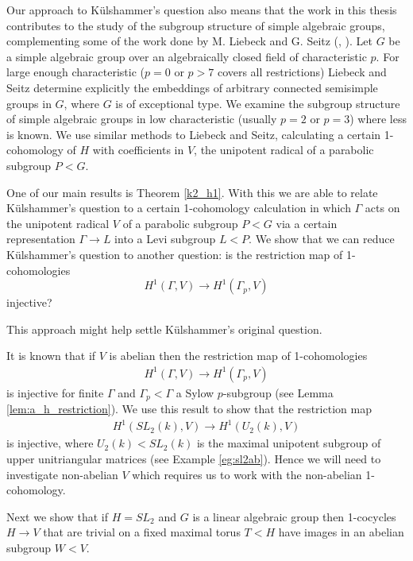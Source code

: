 Our approach to K\"ulshammer's question also means that the work in this thesis contributes to the study of the subgroup structure of simple algebraic groups, complementing some of the work done by M. Liebeck and G. Seitz (\cite{liebeck1996reductive}, \cite{liebeck2004maximal}). Let $G$ be a simple algebraic group over an algebraically closed field of characteristic $p$. For large enough characteristic ($p=0$ or $p>7$ covers all restrictions) Liebeck and Seitz determine explicitly the embeddings of arbitrary connected semisimple groups in $G$, where $G$ is of exceptional type. We examine the subgroup structure of simple algebraic groups in low characteristic (usually $p=2$ or $p=3$) where less is known. We use similar methods to Liebeck and Seitz, calculating a certain 1-cohomology of $H$ with coefficients in $V$, the unipotent radical of a parabolic subgroup $P < G$.


One of our main results is Theorem \ref{k2_h1}. With this we are able to relate K\"ulshammer's question to a certain 1-cohomology calculation in which $\Gamma$ acts on the unipotent radical $V$ of a parabolic subgroup $P < G$ via a certain representation $\Gamma \rightarrow L$ into a Levi subgroup $L < P$. We show that we can reduce K\"ulshammer's question to another question: is the restriction map of 1-cohomologies
\begin{displaymath}
  H^1(\Gamma, V) \rightarrow H^1(\Gamma_p, V)
\end{displaymath}
injective?


This approach might help settle K\"ulshammer's original question.


It is known that if $V$ is abelian then the restriction map of 1-cohomologies
\begin{eqnarray*}
  H^1(\Gamma, V)\rightarrow H^1(\Gamma_p, V)
\end{eqnarray*}
is injective for finite $\Gamma$ and $\Gamma_p < \Gamma$ a Sylow $p$-subgroup (see Lemma \ref{lem:a_h_restriction}). We use this result to show that the restriction map
\begin{eqnarray*}
  H^1(SL_2(k), V) \rightarrow H^1(U_2(k), V)
\end{eqnarray*}
is injective, where $U_2(k) < SL_2(k)$ is the maximal unipotent subgroup of upper unitriangular matrices (see Example \ref{eg:sl2ab}). Hence we will need to investigate non-abelian $V$ which requires us to work with the non-abelian 1-cohomology.


Next we show that if $H = SL_2$ and $G$ is a linear algebraic group then 1-cocycles $H\rightarrow V$ that are trivial on a fixed maximal torus $T < H$ have images in an abelian subgroup $W < V$.
		
